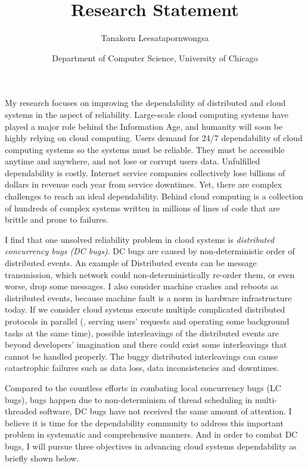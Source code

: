\documentclass[11pt]{article}
\begin{document}
\title{Research Statement}
\author{Tanakorn Leesatapornwongsa}
\date{\vspace{-1ex} \small{Department of Computer Science, University of
Chicago}}

\maketitle

My research focuses on improving the dependability of distributed and cloud
systems in the aspect of reliability. Large-scale cloud computing systems have
played a major role behind the Information Age, and humanity will soon be highly
relying on cloud computing. Users demand for 24/7 dependability of cloud
computing systems so the systems must be reliable. They must be accessible
anytime and anywhere, and not lose or corrupt users data. Unfulfilled
dependability is costly. Internet service companies collectively lose billions
of dollars in revenue each year from service downtimes. Yet, there are complex
challenges to reach an ideal dependability. Behind cloud computing is a
collection of hundreds of complex systems written in millions of lines of code
that are brittle and prone to failures.

I find that one unsolved reliability problem in cloud systems is
\textit{distributed concurrency bugs (DC bugs)}. DC bugs are caused by
non-deterministic order of distributed events. An example of Distributed events
can be message transmission, which network could non-deterministically re-order
them, or even worse, drop some messages. I also consider machine crashes and
reboots as distributed events, because machine fault is a norm in hardware
infrastructure today. If we consider cloud systems execute multiple complicated
distributed protocols in parallel (\eg, serving users' requests and operating
some background tasks at the same time), possible interleavings of the
distributed events are beyond developers' imagination and there could exist some
interleavings that cannot be handled properly. The buggy distributed
interleavings can cause catastrophic failures such as data loss, data
inconsistencies and downtimes. 

Compared to the countless efforts in combating local concurrency bugs (LC bugs),
bugs happen due to non-determinism of thread scheduling in multi-threaded
software, DC bugs have not received the same amount of attention. I believe it
is time for the dependability community to address this important problem in
systematic and comprehensive manners. And in order to combat DC bugs, I will
pursue three objectives in advancing cloud systems dependability as briefly
shown below.
\end{document}
